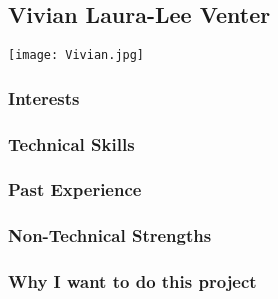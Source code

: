 \subsection{Vivian Laura-Lee Venter}
\texttt{[image: Vivian.jpg]}

\subsubsection{Interests}
\subsubsection{Technical Skills}
\subsubsection{Past Experience}
\subsubsection{Non-Technical Strengths}
\subsubsection{Why I want to do this project}
